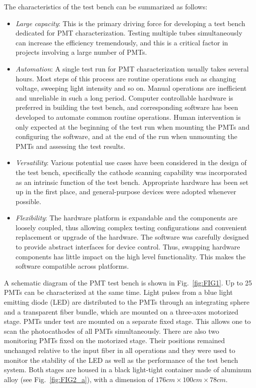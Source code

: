 \documentclass{nst}
\begin{document}
The characteristics of the test bench can be summarized as follows:
\begin{itemize}
	\item \textit{Large capacity}: This is the primary driving force for developing a test bench dedicated for PMT characterization.
	Testing multiple tubes simultaneously can increase the efficiency tremendously, and this is a critical factor in projects involving a large number of PMTs. 
	\item \textit{Automation}: A single test run for PMT characterization usually takes several hours. Most steps of this process are routine operations such as changing voltage, sweeping light intensity and so on.
	Manual operations are inefficient and unreliable in such a long period.
	Computer controllable hardware is preferred in building the test bench, and corresponding software has been developed to automate common routine operations.
	Human intervention is only expected at the beginning of the test run when mounting the PMTs and configuring the software, and at the end of the run when unmounting the PMTs and assessing the test results.
	\item \textit{Versatility}: Various potential use cases have been considered in the design of the test bench, specifically the cathode scanning capability was incorporated as an intrinsic function of the test bench.
	Appropriate hardware has been set up in the first place, and general-purpose devices were adopted whenever possible.
	\item \textit{Flexibility}: %
	The hardware platform is expandable and the components are loosely coupled, thus allowing complex testing configurations and convenient replacement or upgrade of the hardware.
	The software was carefully designed to provide abstract interfaces for device control. Thus, swapping hardware components has little impact on the high level functionality. This makes the software compatible across platforms.
\end{itemize}

A schematic diagram of the PMT test bench is shown in Fig.~\ref{fig:FIG1}.
Up to 25 PMTs can be characterized at the same time.
Light pulses from a blue light emitting diode (LED) are distributed to the PMTs through an integrating sphere and a transparent fiber bundle, which are mounted on a three-axes motorized stage.
PMTs under test are mounted on a separate fixed stage. This allows one to scan the photocathodes of all PMTs simultaneously.
There are also two monitoring PMTs fixed on the motorized stage.
Their positions remained unchanged relative to the input fiber in all operations and they were used to monitor the stability of the LED as well as the performance of the test bench system.
Both stages are housed in a black light-tight container made of aluminum alloy (see Fig.~\ref{fig:FIG2_a}), with a dimension of $176cm\times100cm\times78cm$.
\end{document}
